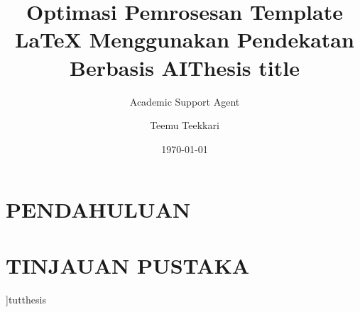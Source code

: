 \documentclass{tutthesis}
\title{Optimasi Pemrosesan Template LaTeX Menggunakan Pendekatan Berbasis AI}
\author{Academic Support Agent}
\date{\today}
\begin{document}
\maketitle

\begin{abstract}

\end{abstract}

\chapter{PENDAHULUAN}


\chapter{TINJAUAN PUSTAKA}


]{tutthesis}









%
%
\author{Teemu Teekkari}
\title{Thesis title} %
\end{document}
